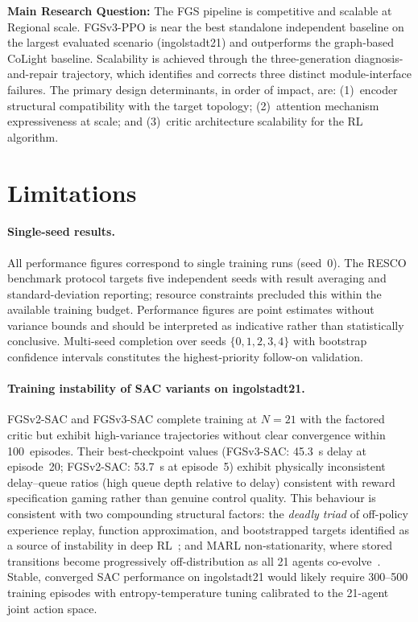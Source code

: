 \medskip
\noindent\textbf{Main Research Question:} The FGS pipeline is competitive and scalable at Regional scale. FGSv3-PPO is near the best standalone independent baseline on the largest evaluated scenario (ingolstadt21) and outperforms the graph-based CoLight baseline. Scalability is achieved through the three-generation diagnosis-and-repair trajectory, which identifies and corrects three distinct module-interface failures. The primary design determinants, in order of impact, are: (1)~encoder structural compatibility with the target topology; (2)~attention mechanism expressiveness at scale; and (3)~critic architecture scalability for the RL algorithm.

\section{Limitations}
\label{sec:ResultsAndDiscussion_Limitations}

\paragraph{Single-seed results.}
All performance figures correspond to single training runs (seed~0). The RESCO benchmark protocol targets five independent seeds with result averaging and standard-deviation reporting; resource constraints precluded this within the available training budget. Performance figures are point estimates without variance bounds and should be interpreted as indicative rather than statistically conclusive. Multi-seed completion over seeds $\{0,1,2,3,4\}$ with bootstrap confidence intervals constitutes the highest-priority follow-on validation.

\paragraph{Training instability of SAC variants on ingolstadt21.}
FGSv2-SAC and FGSv3-SAC complete training at $N=21$ with the factored critic but exhibit high-variance trajectories without clear convergence within 100~episodes. Their best-checkpoint values (FGSv3-SAC: 45.3~s delay at episode~20; FGSv2-SAC: 53.7~s at episode~5) exhibit physically inconsistent delay--queue ratios (high queue depth relative to delay) consistent with reward specification gaming rather than genuine control quality. This behaviour is consistent with two compounding structural factors: the \emph{deadly triad} of off-policy experience replay, function approximation, and bootstrapped targets identified as a source of instability in deep RL~\citep{van2018deep}; and MARL non-stationarity, where stored transitions become progressively off-distribution as all 21 agents co-evolve~\citep{henderson2018deep}. Stable, converged SAC performance on ingolstadt21 would likely require 300--500 training episodes with entropy-temperature tuning calibrated to the 21-agent joint action space.

